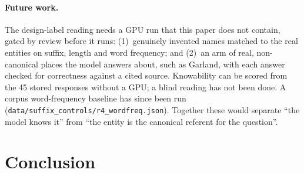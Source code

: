 \documentclass[11pt,a4paper]{article}
\begin{document}
\paragraph{Future work.}
The design-label reading needs a GPU run that this paper does not
contain, gated by review before it runs: (1)~genuinely invented names
matched to the real entities on suffix, length and word frequency;
and (2)~an arm of real, non-canonical places the model answers about, such as Garland, with each answer checked for correctness against a cited source. Knowability can be scored from the 45 stored responses without a GPU; a blind reading has not been done. A corpus word-frequency baseline has since been run (\texttt{data/\allowbreak suffix\_controls/\allowbreak r4\_wordfreq.json}). Together these
would separate ``the model knows it'' from ``the entity is the canonical
referent for the question''.

\section{Conclusion}
\end{document}
